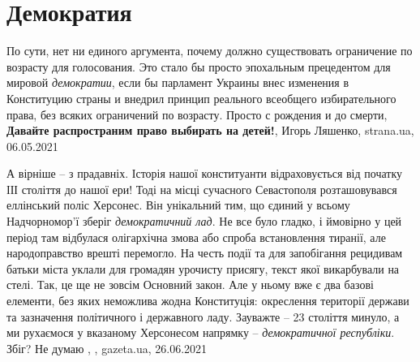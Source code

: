  
 
 
 
 
\chapter{Демократия}
\label{sec:slova.demokratia}

По сути, нет ни единого аргумента, почему должно существовать ограничение по
возрасту для голосования. Это стало бы просто эпохальным прецедентом для
мировой \emph{демократии}, если бы парламент Украины внес изменения в
Конституцию страны и внедрил принцип реального всеобщего избирательного права,
без всяких ограничений по возрасту.  Просто с рождения и до смерти,
\textbf{Давайте распространим право выбирать на детей!},
Игорь Ляшенко, strana.ua, 06.05.2021

А вірніше – з прадавніх. Історія нашої конституанти відраховується від початку
ІІІ століття до нашої ери! Тоді на місці сучасного Севастополя розташовувався
еллінський поліс Херсонес. Він унікальний тим, що єдиний у всьому Надчорномор'ї
зберіг \emph{демократичний лад}. Не все було гладко, і ймовірно у цей період
там відбулася олігархічна змова або спроба встановлення тиранії, але
народоправство врешті перемогло. На честь події та для запобігання рецидивам
батьки міста уклали для громадян урочисту присягу, текст якої викарбували на
стелі. Так, це ще не зовсім Основний закон. Але у ньому вже є два базові
елементи, без яких неможлива жодна Конституція: окреслення території держави та
зазначення політичного і державного ладу.  Зауважте – 23 століття минуло, а ми
рухаємося у вказаному Херсонесом напрямку – \emph{демократичної республіки}.
Збіг? Не думаю
, 
, gazeta.ua, 26.06.2021


